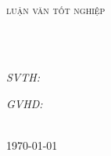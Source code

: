 \begin{titlepage}
\begin{center}
{\scshape\LARGE \univname\par}
\vspace{0.5cm}
{\scshape\LARGE \facname\par}
\vspace{1.0cm} %
\\
\vspace{1.0cm}
\textsc{\Large luận văn tốt nghiệp}\\[0.5cm] %

\HRule \\[0.4cm] %
{\LARGE \bfseries \ttitle\par}\vspace{0.4cm} %
\HRule \\[1.5cm] %
 
\begin{minipage}[t]{0.4\textwidth}
\begin{flushleft} \large
\emph{SVTH:}\\
\authorname 
\end{flushleft}
\end{minipage}
\begin{minipage}[t]{0.45\textwidth}
\begin{flushright} \large
\emph{GVHD:} \\
\supname
\end{flushright}
\end{minipage}\\[1cm]
 
{\large \today} %

\end{center}
\end{titlepage}